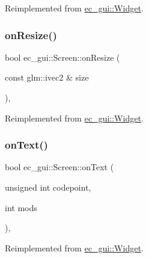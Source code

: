 Reimplemented from \mbox{\hyperlink{classec__gui_1_1_widget_a895600dcaf4c40a39828ac01791e199e}{ec\+\_\+gui\+::\+Widget}}.

\mbox{\label{classec__gui_1_1_screen_a5aae70a6f4fab5d4242d32fe2ce29889}} 
\subsubsection{\texorpdfstring{on\+Resize()}{onResize()}}
{\footnotesize\ttfamily bool ec\+\_\+gui\+::\+Screen\+::on\+Resize (\begin{DoxyParamCaption}\item[{const glm\+::ivec2 \&}]{size }\end{DoxyParamCaption})\hspace{0.3cm}{\ttfamily [override]}, {\ttfamily [virtual]}}



Reimplemented from \mbox{\hyperlink{classec__gui_1_1_widget_a8894ab7ea0791865e6fe8ea5d909f071}{ec\+\_\+gui\+::\+Widget}}.

\mbox{\label{classec__gui_1_1_screen_a1becce24696b898cf30cd69815905f82}} 
\subsubsection{\texorpdfstring{on\+Text()}{onText()}}
{\footnotesize\ttfamily bool ec\+\_\+gui\+::\+Screen\+::on\+Text (\begin{DoxyParamCaption}\item[{unsigned int}]{codepoint,  }\item[{int}]{mods }\end{DoxyParamCaption})\hspace{0.3cm}{\ttfamily [override]}, {\ttfamily [virtual]}}



Reimplemented from \mbox{\hyperlink{classec__gui_1_1_widget_a794ce0ee48989a1dbc40cad96a11eb9a}{ec\+\_\+gui\+::\+Widget}}.

\mbox{\label{classec__gui_1_1_screen_adf5a08d769e059f46261de227506cf9a}} 
